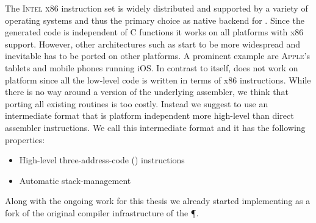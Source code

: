 The \textsc{Intel x86} instruction set is widely distributed and supported by a variety of operating systems and thus the primary choice as native backend for \B.
Since the generated code is independent of C functions it works on all platforms with x86 support.
However, other architectures such as \ARM start to be more widespread and inevitable \B has to be ported on other platforms.
A prominent example are \textsc{Apple}'s tablets and mobile phones running iOS.
In contrast to \PH itself, \B does not work on \ARM platform since all the low-level code is written in terms of x86 instructions.
While there is no way around a \ARM version of the underlying assembler, we think that porting all existing \B routines is too costly.
Instead we suggest to use an intermediate format that is platform independent more high-level than direct assembler instructions.
We call this intermediate format \VCPU and it has the following properties:
%
\begin{itemize}[noitemsep]
	\item High-level three-address-code (\TAC) instructions
	\item Automatic stack-management
\end{itemize}
%
Along with the ongoing work for this thesis we already started implementing \VCPU as a fork of the original compiler infrastructure of the \P \VM.

